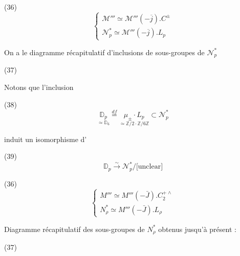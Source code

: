\begin{enumerate}
\newpage



\newpage



\newpage


(36)
$$
\begin{cases}
\mathcal{M}''' \simeq \mathcal{M}'''(-\overline{j}) . C^{\pm} \\
\mathcal{N}_p^* \simeq \mathcal{M}'''(-\overline{j}) . L_p
\end{cases}
$$

On a le diagramme récapitulatif
d'inclusions de sous-groupes de $\mathcal{N}_p^*$

(37)

Notons que l'inclusion

(38) $$ \underset{\simeq \mathbb{D}_6}{\mathbb{D}_p} \overset{df}{=} \underset{\simeq \mathbb{Z}/2 \cdot \mathbb{Z}/6\mathbb{Z}}{\mu_{\pm} \cdot L_p} \subset \mathcal{N}_p^* $$

induit un isomorphisme d'

(39) $$ \mathbb{D}_p \overset{\sim}{\longrightarrow} \mathcal{N}_p^* / \text{[unclear]} $$

\newpage


(36) 
$$ \begin{cases} M''' \simeq M'''(-\bar{J}) . C_2^{+\wedge} \\ N_{\rho}^* \simeq M'''(-\bar{J}) . L_{\rho} \end{cases} $$

Diagramme récapitulatif des sous-groupes de $N_{\rho}^*$ obtenus jusqu'à présent :

(37)


\end{enumerate}
